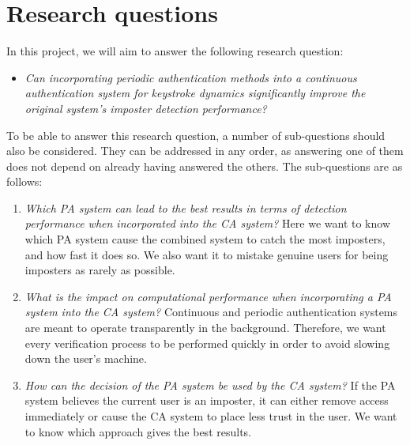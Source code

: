 \documentclass[informationsecurity]{gucmasterproject}
\begin{document}
\section{Research questions}
\label{research:questions}
In this project, we will aim to answer the following research question:
\begin{itemize}
    \item \textit{Can incorporating periodic authentication methods into a continuous authentication system for keystroke dynamics significantly improve the original system's imposter detection performance?}
\end{itemize}
To be able to answer this research question, a number of sub-questions should also be considered.
They can be addressed in any order, as answering one of them does not depend on already having answered the others.
The sub-questions are as follows:
\begin{enumerate}
\item \textit{Which PA system can lead to the best results in terms of detection performance when incorporated into the CA system?} Here we want to know which PA system cause the combined system to catch the most imposters, and how fast it does so. We also want it to mistake genuine users for being imposters as rarely as possible.
\item \textit{What is the impact on computational performance when incorporating a PA system into the CA system?} Continuous and periodic authentication systems are meant to operate transparently in the background. Therefore, we want every verification process to be performed quickly in order to avoid slowing down the user's machine.
\item \textit{How can the decision of the PA system be used by the CA system?} If the PA system believes the current user is an imposter, it can either remove access immediately or cause the CA system to place less trust in the user. We want to know which approach gives the best results.

\end{enumerate}
\end{document}
